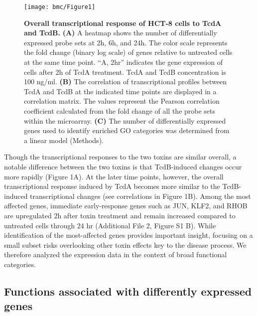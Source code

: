 \begin{figure}[h!]
  \centering
  \texttt{[image: bmc/Figure1]}
  \caption[Overall transcriptional response of HCT-8 cells to TcdA and TcdB]{
       \textbf{Overall transcriptional response of HCT-8 cells to TcdA and TcdB.}
       \textbf{(A)} A heatmap shows the number of differentially expressed probe sets at 2h, 6h, and 24h. The color scale represents the fold change (binary log scale) of genes relative to untreated cells at the same time point. “A, 2hr” indicates the gene expression of cells after 2h of TcdA treatment. TcdA and TcdB concentration is 100 ng/ml.
       \textbf{(B)} The correlation of transcriptional profiles between TcdA and TcdB at the indicated time points are displayed in a correlation matrix. The values represent the Pearson correlation coefficient calculated from the fold change of all the probe sets within the microarray.
       \textbf{(C)} The number of differentially expressed genes used to identify enriched GO categories was determined from a linear model (Methods).
}
  \label{bmc:fig1}
\end{figure}

Though the transcriptional responses to the two toxins are similar overall, a notable difference between the two toxins is that TcdB-induced changes occur more rapidly (Figure 1A). At the later time points, however, the overall transcriptional response induced by TcdA becomes more similar to the TcdB-induced transcriptional changes (see correlations in Figure 1B). Among the most affected genes, immediate early-response genes such as JUN, KLF2, and RHOB are upregulated 2h after toxin treatment and remain increased compared to untreated cells through 24 hr (Additional File 2, Figure S1 B). While identification of the most-affected genes provides important insight, focusing on a small subset risks overlooking other toxin effects key to the disease process. We therefore analyzed the expression data in the context of broad functional categories.

\subsection{Functions associated with differently expressed genes}

